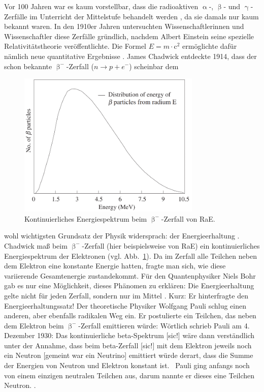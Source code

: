 \documentclass[a4paper,12pt]{article}
\newcommand{\figref}[1]{Abb.~\ref{#1}}
\begin{document}
Vor 100 Jahren war es kaum vorstellbar, dass die radioaktiven $\upalpha$-, $\upbeta$- und $\upgamma$-Zerfälle im Unterricht der Mittelstufe behandelt werden \cite{SSB}, da sie damals nur kaum bekannt waren. In den 1910er Jahren untersuchten Wissenschaftlerinnen und Wissenschaftler diese Zerfälle gründlich, nachdem Albert Einstein seine spezielle Relativitätstheorie veröffentlichte. Die Formel $E=m\cdot \mathrm{c}^2$ ermöglichte dafür nämlich neue quantitative Ergebnisse \cite[15]{Close2012}. James Chadwick entdeckte 1914, dass der schon bekannte $\upbeta^-$-Zerfall ($n \rightarrow p + e^-$) scheinbar dem
\begin{figure}[b!]
\centering
\includegraphics[scale=1]{Betazerfall}
\caption[Kontinuierliches Energiespektrum beim $\upbeta^-$-Zerfall von RaE. -- Quelle: {\cite[][2]{Athar2020}}]{Kontinuierliches Energiespektrum beim $\upbeta^-$-Zerfall von RaE.}
\label{fig:betazerfall}
\end{figure}
wohl wichtigsten Grundsatz der Physik widersprach: der Energieerhaltung \cite[4]{Ecker2020}. Chadwick maß beim $\upbeta^-$-Zerfall (hier beispielsweise von RaE) ein kontinuierliches Energiespektrum der Elektronen \cite[4]{Ecker2020} (vgl. \figref{fig:betazerfall}). Da im Zerfall alle Teilchen neben dem Elektron eine konstante Energie hatten, fragte man sich, wie diese variierende Gesamtenergie zustandekommt. Für den Quantenphysiker Niels Bohr gab es nur eine Möglichkeit, dieses Phänomen zu erklären: Die Energieerhaltung gelte nicht für jeden Zerfall, sondern nur im Mittel \cite[4]{Ecker2020}. Kurz: Er hinterfragte den Energieerhaltungssatz! Der theoretische Physiker Wolfgang Pauli schlug einen anderen, aber ebenfalls radikalen Weg ein. Er postulierte ein Teilchen, das neben dem Elektron beim $\upbeta^-$-Zerfall emittieren würde: Wörtlich schrieb Pauli am 4. Dezember 1930: \glqq Das kontinuierliche beta-Spektrum [sic!] wäre dann verständlich unter der Annahme, dass beim beta-Zerfall [sic!] mit dem Elektron jeweils noch ein Neutron [gemeint war ein Neutrino] emittiert würde derart, dass die Summe der Energien von Neutron und Elektron konstant ist.\grqq \ \cite[2]{Pauli} Pauli ging anfangs noch von einem einzigen neutralen Teilchen aus, darum nannte er dieses eine Teilchen Neutron. \cite[vgl.][2]{Pauli}.
\end{document}
